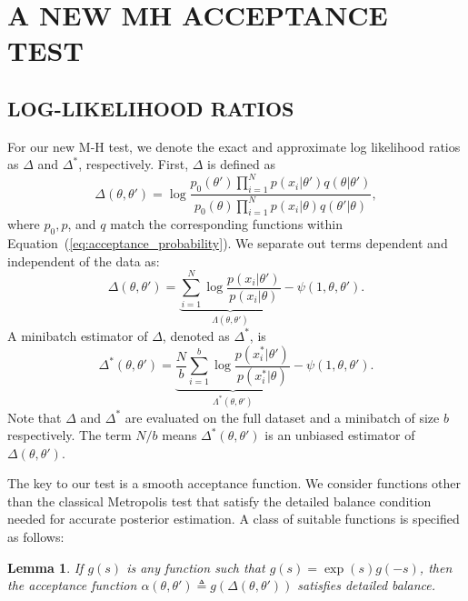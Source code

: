 \documentclass[letterpaper]{article}
\newtheorem{lemma}{Lemma}
\begin{document}
\section{A NEW MH ACCEPTANCE TEST}\label{sec:our_algorithm}

\subsection{LOG-LIKELIHOOD RATIOS}\label{ssec:log_likelihood_ratios}

For our new M-H test, we denote the exact and approximate log likelihood ratios
as $\Delta$ and $\Delta^*$, respectively. First, $\Delta$ is defined as
\begin{equation}\label{eq:delta1}
    \Delta(\theta,\theta')  =
    \log \frac{p_0(\theta')\prod_{i=1}^N p(x_i | \theta')q(\theta |
    \theta')}{p_0(\theta)\prod_{i=1}^N p(x_i | \theta)q(\theta' | \theta)},
\end{equation}
where $p_0, p$, and $q$ match the corresponding functions within
Equation~(\ref{eq:acceptance_probability}). We separate out terms dependent and
independent of the data as:
\begin{equation}\label{eq:delta2}
\Delta(\theta,\theta') =
\underbrace{\sum_{i=1}^N\log\frac{p(x_i | \theta')}{p(x_i | \theta)}}_{\Lambda(\theta,\theta')}
- \psi(1,\theta,\theta').
\end{equation}
A minibatch estimator of $\Delta$, denoted as $\Delta^*$, is
\begin{equation}\label{eq:delta3}
\Delta^*(\theta,\theta') =
\underbrace{\frac{N}{b}\sum_{i=1}^b\log\frac{p(x_i^* | \theta')}{p(x_i^* | \theta)}}_{\Lambda^*(\theta,\theta')}
- \psi(1,\theta,\theta').
\end{equation}
Note that $\Delta$ and $\Delta^*$ are evaluated on the full dataset and a
minibatch of size $b$ respectively. The term $N/b$ means
$\Delta^*(\theta,\theta')$ is an unbiased estimator of $\Delta(\theta,\theta')$.

The key to our test is a smooth acceptance function.  We consider functions
other than the classical Metropolis test that satisfy the detailed balance
condition needed for accurate posterior estimation. A class of suitable
functions is specified as follows:

\begin{lemma}\label{lem:detailed_balance}
    If $g(s)$ is any function such that $g(s) = \exp(s) g(-s)$, then the
    acceptance function $\alpha(\theta,\theta') \triangleq
    g(\Delta(\theta,\theta'))$ satisfies detailed balance.
\end{lemma}
\end{document}
